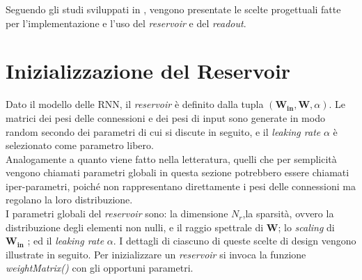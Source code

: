 Seguendo gli studi sviluppati in \cite{praticalguide}, vengono presentate le scelte progettuali fatte per l'implementazione e l'uso del \textit{reservoir} e del \textit{readout}.
\section{Inizializzazione del Reservoir}
Dato il modello delle RNN, il \textit{reservoir} è definito dalla tupla $(\mathbf{W_{in}},\mathbf{W}, \alpha)$. Le matrici dei pesi delle connessioni e dei pesi di input sono generate in modo random secondo dei parametri di cui si discute in seguito, e il \textit{leaking rate} $\alpha$ è selezionato come parametro libero.\\
Analogamente a quanto viene fatto nella letteratura, quelli che per semplicità vengono chiamati parametri globali in questa sezione potrebbero essere chiamati iper-parametri, poiché non rappresentano direttamente i pesi delle connessioni ma regolano la loro distribuzione.\\
I parametri globali del \textit{reservoir} sono: la dimensione $N_r$,la sparsità, ovvero la distribuzione degli elementi non nulli, e il raggio spettrale di $\mathbf{W}$; lo \textit{scaling} di $\mathbf{W_{in}}$ ; ed il \textit{leaking rate} $\alpha$.
I dettagli di ciascuno di queste scelte di design vengono illustrate in seguito.
Per inizializzare un \textit{reservoir} si  invoca la funzione \textit{weightMatrix()} con gli opportuni parametri.\\
\\


